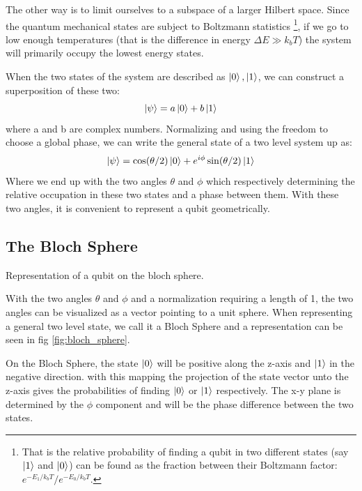The other way is to limit ourselves to a subspace of a larger Hilbert space. Since the quantum mechanical states are subject to Boltzmann statistics \footnote{That is the relative probability of finding a qubit in two different states (say $\ket{1}$ and $\ket{0}$) can be found as the fraction between their Boltzmann factor: $e^{-E_1 / k_b  T} / e^{- E_0 / k_b  T}$.}, if we go to low enough temperatures (that is the difference in energy $\Delta E \gg k_b T$)  the system will primarily occupy the lowest energy states. 

When the two states of the system are described as $\ket{0}, \ket{1}$, we can construct a superposition of these two:
\begin{equation}
    \ket{\psi} = a \ket{0} + b \ket{1}
\end{equation}
where a and b are complex numbers. Normalizing and using the freedom to choose a global phase, we can write the general state of a two level system up as:
\begin{equation}\label{eq:general_2_state}
    \ket{\psi} = \cos (\theta / 2) \ket{0} + e^{i\phi}\sin(\theta / 2)\ket{1}
\end{equation}
Where we end up with the two angles $\theta$ and $\phi$ which respectively determining the relative occupation in these two states and a phase between them. With these two angles, it is convenient to represent a qubit geometrically.

\subsection{The Bloch Sphere}
\begin{marginfigure}[3 cm]
    \centering
    \caption{Representation of a qubit on the bloch sphere.}
    \label{fig:bloch_sphere}
\end{marginfigure}
With the two angles $\theta$ and $\phi$ and a normalization requiring a length of 1, the two angles can be visualized as a vector pointing to a unit sphere. When representing a general two level state, we call it a Bloch Sphere and a representation can be seen in fig \ref{fig:bloch_sphere}.

On the Bloch Sphere, the state $\ket{0}$ will be positive along the z-axis and $\ket{1}$ in the negative direction. with this mapping the projection of the state vector unto the z-axis gives the probabilities of finding $\ket{0}$ or $\ket{1}$ respectively. The x-y plane is determined by the $\phi$ component and will be the phase difference between the two states. 


